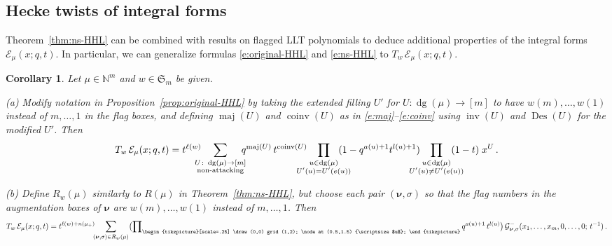 \documentclass[12pt]{amsart}
\newtheorem{cor}[thm]{Corollary}
\theoremstyle{definition}
\theoremstyle{remark}
\newcommand{\NN}{{\mathbb N}}
\newcommand{\nubold}{{\boldsymbol \nu }}
\newcommand{\Sfrak}{{\mathfrak S}}
\newcommand{\Ecal}{{\mathcal E}}
\newcommand{\Gcal}{{\mathcal G}}
\newcommand{\domino}{\begin{tikzpicture}[scale=.25]
\draw (0,0) grid (1,2);
\node at (0.5,1.5) {\scriptsize $u$};
\end{tikzpicture}}
\DeclareMathOperator{\dg}{dg}
\DeclareMathOperator{\inv}{inv}
\DeclareMathOperator{\coinv}{coinv}
\DeclareMathOperator{\maj}{maj}
\DeclareMathOperator{\Des}{Des}
\begin{document}
\subsection{Hecke twists of integral forms}
\label{ss:more-about-Ecal}

Theorem~\ref{thm:ns-HHL} can be combined with results on flagged LLT
polynomials to deduce additional properties of the integral forms
$\Ecal _{\mu }(x;q,t)$.  In particular, we can generalize formulas
\eqref{e:original-HHL} and \eqref{e:ns-HHL} to $T_{w} \, \Ecal _{\mu
}(x;q,t)$.

\begin{cor}\label{cor:ns-HHL-twisted}
Let $\mu \in \NN ^{m}$ and $w\in \Sfrak _{m}$ be given.

(a) Modify notation in Proposition~\ref{prop:original-HHL} by taking
the extended filling $U'$ for $U\colon \dg (\mu )\rightarrow [m]$ to
have $w(m),\ldots,w(1)$ instead of $m,\ldots,1$ in the flag boxes, and
defining $\maj (U)$ and $\coinv (U)$ as in
\eqref{e:maj}--\eqref{e:coinv} using $\inv (U)$ and $\Des (U)$ for the
modified $U'$.  Then
\begin{equation}\label{e:original-HHL-twisted}
T_{w}\, \Ecal _{\mu }(x;q,t) = t^{\ell (w)}\hspace{-2ex}
\sum _{\substack{U \colon \dg (\mu )\rightarrow [m]\\
\text{non-attacking}}} \hspace{-1.5ex}  q^{\maj (U)}\, t^{\coinv (U)}
\hspace{-3ex} \prod _{\substack{u\in \dg (\mu )\\ U'(u) = U'(e(u))}}
\hspace{-3ex} (1 - q^{a(u)+1} t^{l(u)+1}) \hspace{-3ex}
\prod _{\substack{u\in \dg (\mu )\\
U'(u) \not = U'(e(u))}} \hspace{-3ex} (1-t)  \; x^{U}\, .
\end{equation}

(b) Define $R_{w}(\mu )$ similarly to $R(\mu )$ in Theorem~\ref{thm:ns-HHL}, but
choose each pair $(\nubold, \sigma )$ so that the flag numbers in
the augmentation boxes of $\nubold $ are $w(m),\ldots,w(1)$ instead of
$m,\ldots,1$.  Then
\begin{equation}\label{e:ns-HHL-twisted}
T_{w}\, \Ecal _{\mu }(x;q,t)\\
 = t^{\ell (w)+n(\mu _{+})} \hspace{-1ex} \sum _{(\nubold, \sigma )\in
R_{w}(\mu )} \bigl( \prod \nolimits_{\domino } q^{a(u)+1}\, t^{l(u)}
\bigr)\, \Gcal _{\nubold, \sigma
}^{-}(x_{1},\ldots,x_{m},0,\ldots,0;\, t^{-1})\, .
\end{equation}
\end{cor}
\end{document}

